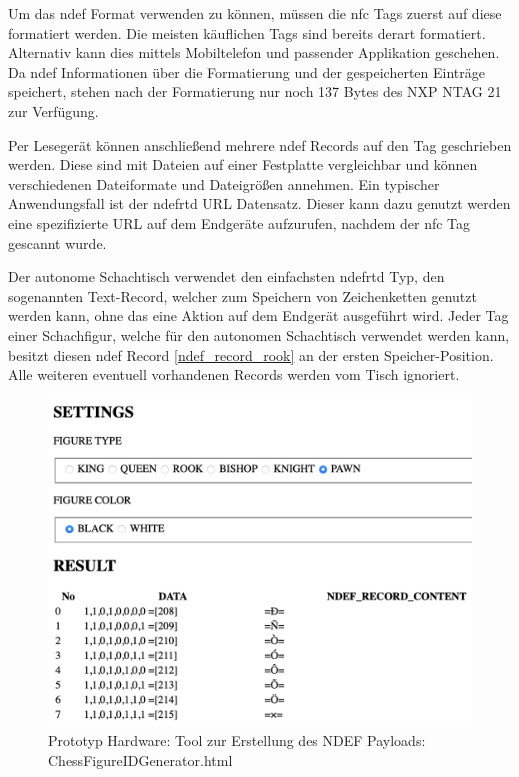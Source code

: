 Um das \gls{ndef} Format verwenden zu können, müssen die \gls{nfc} Tags
zuerst auf diese formatiert werden. Die meisten käuflichen Tags sind
bereits derart formatiert. Alternativ kann dies mittels Mobiltelefon und
passender Applikation geschehen. Da \gls{ndef} Informationen über die
Formatierung und der gespeicherten Einträge speichert, stehen nach der
Formatierung nur noch 137 Bytes des NXP NTAG 21 zur Verfügung.

Per Lesegerät können anschließend mehrere \gls{ndef} Records auf den Tag
geschrieben werden. Diese sind mit Dateien auf einer Festplatte
vergleichbar und können verschiedenen Dateiformate und Dateigrößen
annehmen. Ein typischer Anwendungsfall ist der \gls{ndefrtd} URL
Datensatz. Dieser kann dazu genutzt werden eine spezifizierte URL auf
dem Endgeräte aufzurufen, nachdem der \gls{nfc} Tag gescannt wurde.
\cite{nordicnfclibndef}

Der autonome Schachtisch verwendet den einfachsten \gls{ndefrtd} Typ,
den sogenannten Text-Record, welcher zum Speichern von Zeichenketten
genutzt werden kann, ohne das eine Aktion auf dem Endgerät ausgeführt
wird. Jeder Tag einer Schachfigur, welche für den autonomen Schachtisch
verwendet werden kann, besitzt diesen \gls{ndef} Record
\ref{ndef_record_rook} an der ersten Speicher-Position. Alle weiteren
eventuell vorhandenen Records werden vom Tisch ignoriert.
\cite{nordicnfclib}

\begin{figure}
\centering
\includegraphics{images/ATC_ChessFigureIDGenerator.png}
\caption{Prototyp Hardware: Tool zur Erstellung des NDEF Payloads:
ChessFigureIDGenerator.html \label{ATC_ChessFigureIDGenerator}}
\end{figure}


